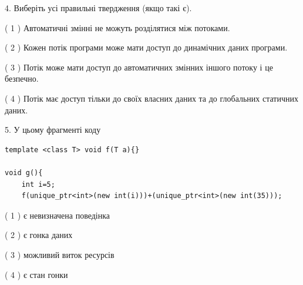 \documentclass[12pt, ukrainian]{article}
\begin{document}
\begin {large}
{%
4. Виберіть усі правильні твердження (якщо такі є).\par
\vspace{2mm}

( 1 ) Автоматичні змінні не можуть розділятися між потоками.%

( 2 ) Кожен потік програми може мати доступ до динамічних даних програми.%

( 3 ) Потік може мати доступ до автоматичних змінних іншого потоку і це безпечно.%

( 4 ) Потік має доступ тільки до своїх власних даних та до глобальних статичних даних.%


5. У цьому фрагменті коду
\begin{verbatim}
template <class T> void f(T a){}

void g(){
    int i=5;
    f(unique_ptr<int>(new int(i)))+(unique_ptr<int>(new int(35)));
\end{verbatim}
( 1 ) є невизначена поведінка%

( 2 ) є гонка даних%

( 3 ) можливий виток ресурсів%

( 4 ) є стан гонки%
}
\end {large}
\end{document}
